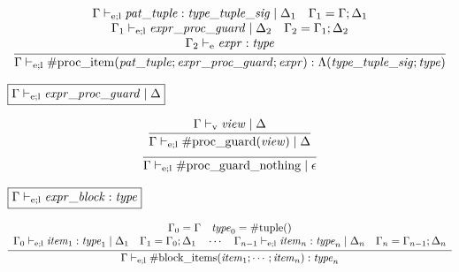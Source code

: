 \begin{gather*}
    \infer{\Gamma \vdash_{\mathrm{e}; \mathrm{l}} \mathrm{\#proc\_item}(\mathit{pat\_tuple}; \mathit{expr\_proc\_guard}; \mathit{expr}): \Lambda(\mathit{type\_tuple\_sig} ;\mathit{type})}{
        \begin{array}{c}
            \Gamma \vdash_{\mathrm{e}; \mathrm{l}} \mathit{pat\_tuple}: \mathit{type\_tuple\_sig} \mid \Delta_1
            \hspace{1em}
            \Gamma_1 = \Gamma; \Delta_1
            \\
            \Gamma_1 \vdash_{\mathrm{e}; \mathrm{l}} \mathit{expr\_proc\_guard} \mid \Delta_2
            \hspace{1em}
            \Gamma_2 = \Gamma_1; \Delta_2
            \\
            \Gamma_2 \vdash_\mathrm{e} \mathit{expr}: \mathit{type}
        \end{array}
    }
\end{gather*}

$\fbox{$\Gamma \vdash_{\mathrm{e}; \mathrm{l}} \mathit{expr\_proc\_guard} \mid \Delta$}$

\begin{gather*}
    \infer{\Gamma \vdash_{\mathrm{e}; \mathrm{l}} \mathrm{\#proc\_guard}(\mathit{view}) \mid \Delta}{
        \Gamma \vdash_\mathrm{v} \mathit{view} \mid \Delta
    }
    \\
    \infer{\Gamma \vdash_{\mathrm{e}; \mathrm{l}} \mathrm{\#proc\_guard\_nothing} \mid \epsilon}{}
\end{gather*}

$\fbox{$\Gamma \vdash_{\mathrm{e}; \mathrm{l}} \mathit{expr\_block}: \mathit{type}$}$

\begin{gather*}
    \infer{\Gamma \vdash_{\mathrm{e}; \mathrm{l}} \mathrm{\#block\_items}(\mathit{item}_1; \cdots; \mathit{item}_n): \mathit{type}_n}{
        \begin{array}{c}
            \Gamma_0 = \Gamma
            \hspace{1em}
            \mathit{type}_0 = \mathrm{\#tuple}()
            \\
            \Gamma_0 \vdash_{\mathrm{e}; \mathrm{l}} \mathit{item}_1: \mathit{type}_1 \mid \Delta_1
            \hspace{1em}
            \Gamma_1 = \Gamma_0; \Delta_1
            \hspace{1em}
            \cdots
            \hspace{1em}
            \Gamma_{n - 1} \vdash_{\mathrm{e}; \mathrm{l}} \mathit{item}_n: \mathit{type}_n \mid \Delta_n
            \hspace{1em}
            \Gamma_n = \Gamma_{n - 1}; \Delta_n
        \end{array}
    }
\end{gather*}

